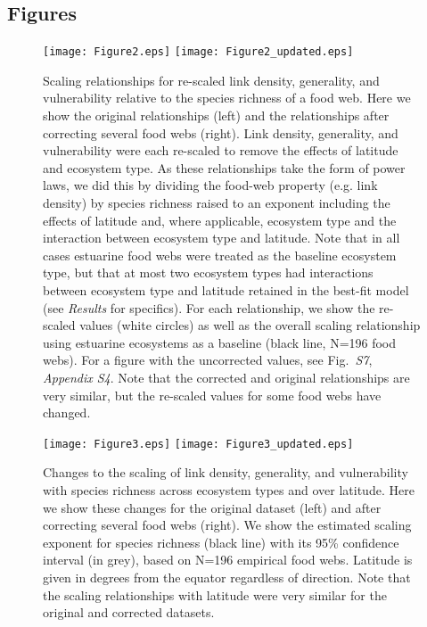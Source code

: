 \documentclass[12pt]{article}
\begin{document}
\begin{spacing}{2.0}
\clearpage

\section*{Figures}

\setcounter{figure}{1}

\begin{figure}[h]
\texttt{[image: Figure2.eps]}
\hspace{.02\textwidth}
\texttt{[image: Figure2\_updated.eps]}

\caption{Scaling relationships for re-scaled link density, generality, and vulnerability 
relative to the species richness of a food web. Here we show the original relationships (left)
and the relationships after correcting several food webs (right). Link density, generality,
and vulnerability were each re-scaled to remove the effects of latitude and ecosystem
type. As these relationships take the form of power laws, we did this by dividing the food-web
property (e.g. link density) by species richness raised to an exponent including the 
effects of latitude and, where applicable, ecosystem type and the interaction between ecosystem
type and latitude. Note that in all cases estuarine food webs were treated as the baseline 
ecosystem type, but that at most two ecosystem types had interactions between ecosystem type and
latitude retained in the best-fit model (see \emph{Results} for specifics). For each relationship, 
we show the re-scaled values (white circles) as well as the overall scaling relationship using estuarine
ecosystems as a baseline (black line, N=196 food webs). For a figure with the uncorrected values,
see Fig.~\emph{S7}, \emph{Appendix S4}. Note that the corrected and original relationships are 
very similar, but the re-scaled values for some food webs have changed.
}
\label{props_v_lat1}
\end{figure}


\begin{figure}[h]
\texttt{[image: Figure3.eps]}
\hspace{.02\textwidth}
\texttt{[image: Figure3\_updated.eps]}
\caption{Changes to the scaling of link density, generality, and vulnerability with species richness 
across ecosystem types and over latitude. Here we show these changes for the original dataset (left) 
and after correcting several food webs (right). We show the estimated scaling exponent for species 
richness (black line) with its 95\% confidence interval (in grey), based on N=196 empirical food 
webs. Latitude is given in degrees from the equator regardless of direction. Note that the scaling
relationships with latitude were very similar for the original and corrected datasets.} 
\label{S1} 
\end{figure}


\end{spacing}
\end{document}
